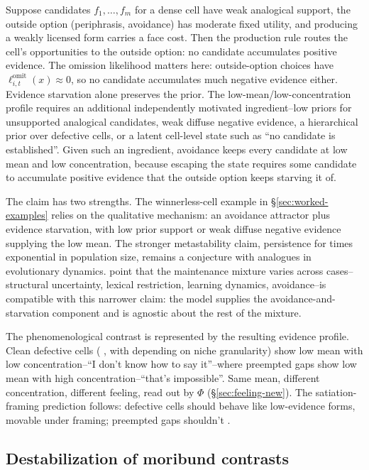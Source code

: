 Suppose candidates $f_1,\dots,f_m$ for a dense cell have weak analogical support,
the outside option (periphrasis, avoidance) has moderate fixed utility, and
producing a weakly licensed form carries a face cost. Then the production rule
routes the cell's opportunities to the outside option: no candidate accumulates
positive evidence. The omission likelihood matters here: outside-option choices
have $\ell^{\mathrm{omit}}_{i,t}(x)\approx0$, so no candidate accumulates much negative evidence
either. Evidence starvation alone preserves the prior. The
low-mean/low-concentration profile requires an
additional independently motivated ingredient--low priors for unsupported
analogical candidates, weak diffuse negative evidence, a hierarchical prior over
defective cells, or a latent cell-level state such as \enquote{no candidate is
established}. Given such an ingredient, avoidance keeps every candidate at low
mean and low concentration, because escaping the state requires some candidate
to accumulate positive evidence that the outside option keeps starving it of.

The claim has two strengths. The winnerless-cell example in
\S\ref{sec:worked-examples} relies on the qualitative mechanism: an avoidance
attractor plus evidence starvation, with low prior support or weak diffuse
negative evidence supplying the low mean. The stronger metastability claim,
persistence for times exponential in population size, remains a conjecture with
analogues in evolutionary dynamics.
 point that the maintenance mixture varies
across cases--structural uncertainty, lexical restriction, learning dynamics,
avoidance--is compatible with this narrower claim: the model supplies the
avoidance-and-starvation component and is agnostic about the rest of the
mixture.

The phenomenological contrast is represented by the resulting evidence profile.
Clean defective cells
( , with  depending on niche
granularity) show low mean with
low concentration--\enquote{I don't know how to say it}--where preempted gaps
show low mean with high concentration--\enquote{that's impossible}. Same mean,
different concentration, different feeling, read out by $\Phi$
(\S\ref{sec:feeling-new}). The satiation-framing prediction follows: defective
cells should behave like low-evidence forms, movable under framing; preempted
gaps shouldn't \autocite{Broadbent2009Amnt,Pertsova2016RussianGaps,
ThomsEtAl2025Amnt}.

\subsection{Destabilization of moribund contrasts}
\label{sec:destabilization}

